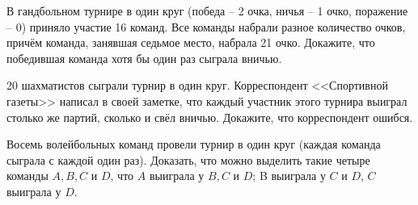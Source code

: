 \documentclass{article}
\begin{document}
\begin{enumerate_boxed}
        \item В гандбольном турнире в один круг (победа – 2 очка, ничья – 1 очко, поражение – 0) приняло участие 16 команд.
        Все команды набрали разное количество очков, причём команда, занявшая седьмое место, набрала 21 очко.
        Докажите, что победившая команда хотя бы один раз сыграла вничью.

        \item 20 шахматистов сыграли турнир в один круг.
        Корреспондент <<Спортивной газеты>> написал в своей заметке, что каждый участник этого турнира выиграл столько же партий, сколько и свёл вничью.
        Докажите, что корреспондент ошибся.

        \item Восемь волейбольных команд провели турнир в один круг (каждая команда сыграла с каждой один раз).
        Доказать, что можно выделить такие четыре команды $A, B, C$ и $D$, что $A$ выиграла у $B, C$ и $D$; B выиграла у $C$ и $D$, $C$ выиграла у $D$.

    \end{enumerate_boxed}
\end{document}
